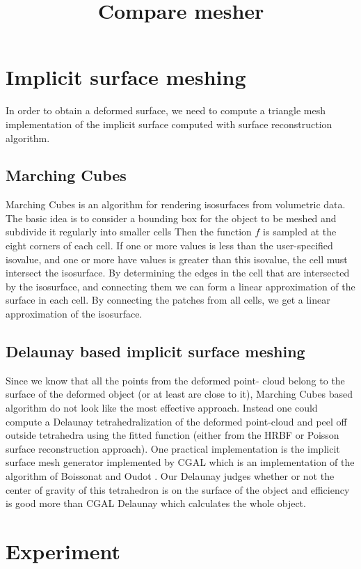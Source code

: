 \documentclass{article}
\title{Compare mesher}
\begin{document}
\maketitle 
\section*{Implicit surface meshing}
In order to obtain a deformed surface, we need to compute a triangle mesh implementation of the implicit surface computed with surface reconstruction algorithm.
\subsection*{Marching Cubes}
Marching Cubes is an algorithm for rendering isosurfaces from volumetric data. The basic idea is to consider a bounding box for the object to be meshed and subdivide it regularly into smaller cells Then the function $f$ is sampled at the eight corners of each cell. If one or more values is less than the user-specified isovalue, and one or more have values is greater than this isovalue, the cell must intersect the isosurface. By determining the edges in the cell that are intersected by the isosurface, and connecting them we can form a linear approximation of the surface in each cell. By connecting the patches from all cells, we get a linear approximation of the isosurface. 
\subsection*{Delaunay based implicit surface meshing}
Since we know that all the points from the deformed point- cloud belong to the surface of the deformed object (or at least are close to it), Marching Cubes based algorithm do not look like the most effective approach. Instead one could compute a Delaunay tetrahedralization of the deformed point-cloud and peel off outside tetrahedra using the fitted function (either from the HRBF or Poisson surface reconstruction approach). One practical implementation is the implicit surface mesh generator implemented by CGAL which is an implementation of the algorithm of Boissonat and Oudot \cite{cgalDelaunay1}.  Our Delaunay judges whether or not the center of gravity of this tetrahedron is on the surface of the object and efficiency is good more than CGAL Delaunay which calculates the whole object.

\section*{Experiment}
\end{document}
